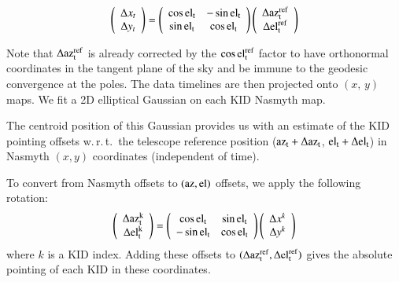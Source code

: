 \documentclass[traditionalabstract]{aa}
\newcommand{\elev}{\rm{el}}
\newcommand{\az}{\rm{az}}
\newcommand{\wrt}{w.\,r.\,t.}
\newcommand{\lp}[1]{#1}
\begin{document}
\begin{equation}
\left( {\begin{array}{c}
\Delta x_t\\
\Delta y_t \\
\end{array}} \right) = 
\left( {\begin{array}{cc}
\cos\elev_t & - \sin\elev_t  \\
\sin \elev_t & \cos \elev_t \\
\end{array}} \right)
\left( {\begin{array}{c}
\Delta \az_t^{\rm{ref}}\\
\Delta \elev_t^{\rm{ref}} \\
\end{array}} \right)
\end{equation}

Note that $\Delta\az_t^{\rm{ref}}$ is already corrected by the $\cos\elev_t^{\rm{ref}}$ factor to
have orthonormal coordinates in the tangent plane of the sky and be immune to
the geodesic convergence at the poles.
The data timelines are then projected onto $(x,\, y)$ maps. 
We fit a 2D elliptical Gaussian on each KID Nasmyth map. {\lp The centroid
position of this Gaussian provides us with an estimate of the KID
pointing offsets \wrt\ the telescope reference position
($\az_t+\Delta\az_t$, $\elev_t+\Delta\elev_t$) in Nasmyth
$(x,y)$ coordinates (independent of time).

To convert from Nasmyth offsets to $(\az,\elev)$ offsets, we apply the
following rotation:
%
\begin{equation}
\left( {\begin{array}{c}
\Delta \az^k_t\\
\Delta \elev^k_t\\
\end{array}} \right) = 
\left( {\begin{array}{cc}
\cos\elev_t & \sin\elev_t  \\
-\sin \elev_t & \cos \elev_t \\
\end{array}} \right)
\left( {\begin{array}{c}
\Delta x^k\\
\Delta y^k\\
\end{array}} \right)
\end{equation}
%
where $k$ is a KID index. Adding these offsets to
$(\Delta \az_t^{\rm{ref}}, \Delta \elev_t^{\rm{ref}})$ gives the
absolute pointing of each KID in these coordinates.}
\end{document}
